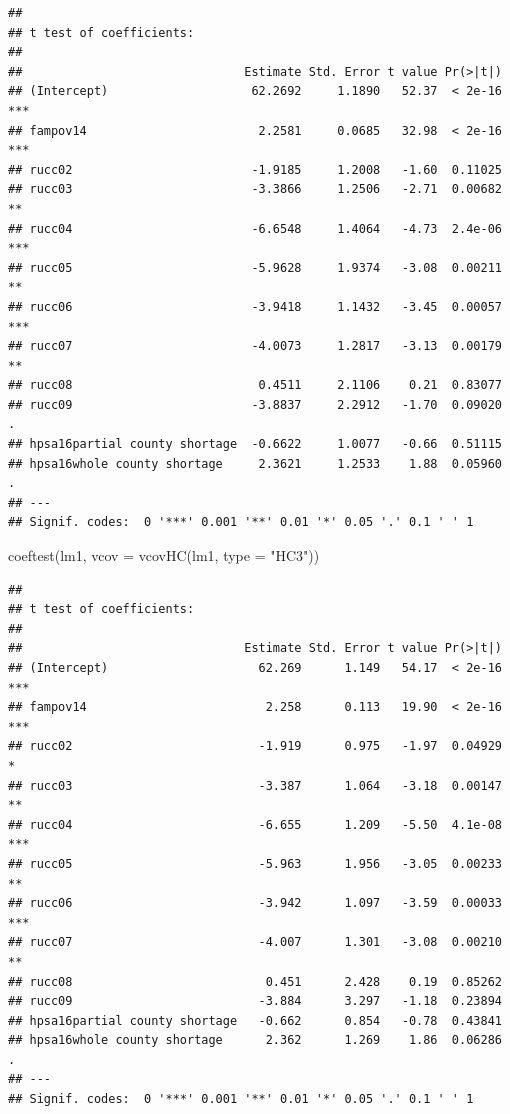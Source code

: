 \documentclass[
]{article}
\newenvironment{Shaded}{\begin{snugshade}}{\end{snugshade}}
\newcommand{\AttributeTok}[1]{\textcolor[rgb]{0.77,0.63,0.00}{#1}}
\newcommand{\FunctionTok}[1]{\textcolor[rgb]{0.00,0.00,0.00}{#1}}
\newcommand{\NormalTok}[1]{#1}
\newcommand{\StringTok}[1]{\textcolor[rgb]{0.31,0.60,0.02}{#1}}
\begin{document}
\begin{verbatim}
## 
## t test of coefficients:
## 
##                               Estimate Std. Error t value Pr(>|t|)    
## (Intercept)                    62.2692     1.1890   52.37  < 2e-16 ***
## fampov14                        2.2581     0.0685   32.98  < 2e-16 ***
## rucc02                         -1.9185     1.2008   -1.60  0.11025    
## rucc03                         -3.3866     1.2506   -2.71  0.00682 ** 
## rucc04                         -6.6548     1.4064   -4.73  2.4e-06 ***
## rucc05                         -5.9628     1.9374   -3.08  0.00211 ** 
## rucc06                         -3.9418     1.1432   -3.45  0.00057 ***
## rucc07                         -4.0073     1.2817   -3.13  0.00179 ** 
## rucc08                          0.4511     2.1106    0.21  0.83077    
## rucc09                         -3.8837     2.2912   -1.70  0.09020 .  
## hpsa16partial county shortage  -0.6622     1.0077   -0.66  0.51115    
## hpsa16whole county shortage     2.3621     1.2533    1.88  0.05960 .  
## ---
## Signif. codes:  0 '***' 0.001 '**' 0.01 '*' 0.05 '.' 0.1 ' ' 1
\end{verbatim}

\begin{Shaded}
\begin{Highlighting}[]
\FunctionTok{coeftest}\NormalTok{(lm1, }\AttributeTok{vcov  =} \FunctionTok{vcovHC}\NormalTok{(lm1, }\AttributeTok{type =} \StringTok{"HC3"}\NormalTok{))}
\end{Highlighting}
\end{Shaded}

\begin{verbatim}
## 
## t test of coefficients:
## 
##                               Estimate Std. Error t value Pr(>|t|)    
## (Intercept)                     62.269      1.149   54.17  < 2e-16 ***
## fampov14                         2.258      0.113   19.90  < 2e-16 ***
## rucc02                          -1.919      0.975   -1.97  0.04929 *  
## rucc03                          -3.387      1.064   -3.18  0.00147 ** 
## rucc04                          -6.655      1.209   -5.50  4.1e-08 ***
## rucc05                          -5.963      1.956   -3.05  0.00233 ** 
## rucc06                          -3.942      1.097   -3.59  0.00033 ***
## rucc07                          -4.007      1.301   -3.08  0.00210 ** 
## rucc08                           0.451      2.428    0.19  0.85262    
## rucc09                          -3.884      3.297   -1.18  0.23894    
## hpsa16partial county shortage   -0.662      0.854   -0.78  0.43841    
## hpsa16whole county shortage      2.362      1.269    1.86  0.06286 .  
## ---
## Signif. codes:  0 '***' 0.001 '**' 0.01 '*' 0.05 '.' 0.1 ' ' 1
\end{verbatim}
\end{document}
